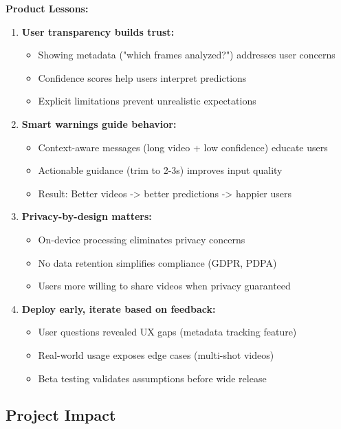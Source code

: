 \documentclass[11pt,a4paper]{article}
\begin{document}
\textbf{Product Lessons:}

\begin{enumerate}
\item \textbf{User transparency builds trust:}
   \begin{itemize}
   \item Showing metadata ("which frames analyzed?") addresses user concerns
   \item Confidence scores help users interpret predictions
   \item Explicit limitations prevent unrealistic expectations
   \end{itemize}

\item \textbf{Smart warnings guide behavior:}
   \begin{itemize}
   \item Context-aware messages (long video + low confidence) educate users
   \item Actionable guidance (trim to 2-3s) improves input quality
   \item Result: Better videos -> better predictions -> happier users
   \end{itemize}

\item \textbf{Privacy-by-design matters:}
   \begin{itemize}
   \item On-device processing eliminates privacy concerns
   \item No data retention simplifies compliance (GDPR, PDPA)
   \item Users more willing to share videos when privacy guaranteed
   \end{itemize}

\item \textbf{Deploy early, iterate based on feedback:}
   \begin{itemize}
   \item User questions revealed UX gaps (metadata tracking feature)
   \item Real-world usage exposes edge cases (multi-shot videos)
   \item Beta testing validates assumptions before wide release
   \end{itemize}
\end{enumerate}

\subsection{Project Impact}
\end{document}
